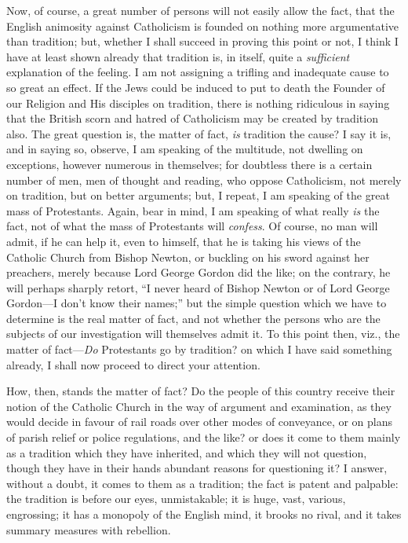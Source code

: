 Now, of course, a great number of persons will not
easily allow the fact, that the English animosity against
Catholicism is founded on nothing more argumentative than
tradition; but, whether I shall succeed in proving this
point or not, I think I have at least shown already that
tradition is, in itself, quite a \emph{sufficient}
explanation of the feeling. I am not assigning a trifling
and inadequate cause to so great an effect. If the Jews
could be induced to put to death the Founder of our
Religion and His disciples on tradition, there is nothing
ridiculous in saying that the British scorn and hatred of
Catholicism may be created by tradition also. The great
question is, the matter of fact, \emph{is} tradition
the cause? I say it is, and in saying so, observe, I am
speaking of the multitude, not dwelling on exceptions,
however numerous in themselves; for doubtless there is a
certain number of men, men of thought and reading, who
oppose Catholicism, not merely on tradition, but on
better arguments; but, I repeat, I am speaking of the
great mass of Protestants. Again, bear in mind, I am
speaking of what really \emph{is} the fact, not of what
the mass of Protestants will \emph{confess}. Of course,
no man will admit, if he can help it, even to himself,
that he is taking his views of the Catholic Church from
Bishop Newton, or buckling on his sword against her
preachers, merely because Lord George Gordon did the
like; on the contrary, he will perhaps sharply retort,
``I never heard of Bishop Newton or of Lord George
Gordon—I don't know their names;'' but the
simple question which we have to determine is the real
matter of fact, and not whether the persons who are the
subjects of our investigation will themselves admit it.
To this point then, viz., the matter of fact—\emph{Do}
Protestants go by tradition? on which I have said
something already, I shall now proceed to direct your
attention.

How, then, stands the matter of fact? Do the people of
this country receive their notion of the Catholic Church
in the way of argument and examination, as they would
decide in favour of rail roads over other modes of
conveyance, or on plans of parish relief or police
regulations, and the like? or does it come to them mainly
as a tradition which they have inherited, and which they
will not question, though they have in their hands
abundant reasons for questioning it? I answer, without a
doubt, it comes to them as a tradition; the fact is
patent and palpable: the tradition is before our eyes,
unmistakable; it is huge, vast, various, engrossing; it
has a monopoly of the English mind, it brooks no rival,
and it takes summary measures with rebellion.

